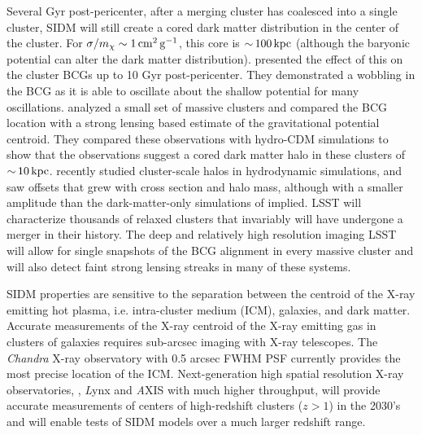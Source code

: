 Several Gyr post-pericenter, after a merging cluster has coalesced into a single cluster, SIDM will still create a cored dark matter distribution in the center of the cluster. For $\sigma/m_\chi \sim 1 \mathrm{\,cm}^{2} \mathrm{\,g}^{-1}$, this core is $ {\sim}\, 100 \mathrm{\,kpc}$ (although the baryonic potential can alter the dark matter distribution). \citet{Kim:2016ujt} presented the effect of this on the cluster BCGs up to 10 Gyr post-pericenter. They demonstrated a wobbling in the BCG as it is able to oscillate about the shallow potential for many oscillations. \citet{1703.07365} analyzed a small set of massive clusters and compared the BCG location with a strong lensing based estimate of the gravitational potential centroid. They compared these observations with hydro-CDM simulations to show that the observations suggest a cored dark matter halo in these clusters of $ {\sim}\, 10\mathrm{\,kpc}$. \citet{Harvey:2018uwf} recently studied cluster-scale halos in hydrodynamic simulations, and saw offsets that grew with cross section and halo mass, although with a smaller amplitude than the dark-matter-only simulations of \citet{Kim:2016ujt} implied. LSST will characterize thousands of relaxed clusters that invariably will have undergone a merger in their history. The deep and relatively high resolution imaging LSST will allow for single snapshots of the BCG alignment in every massive cluster and will also detect faint strong lensing streaks in many of these systems.

SIDM properties are sensitive to the separation between the  centroid of the X-ray emitting hot plasma, i.e. intra-cluster medium (ICM), galaxies, and dark matter. Accurate measurements of the X-ray centroid of the X-ray emitting gas in clusters of galaxies requires sub-arcsec imaging with X-ray telescopes. The {\it Chandra} X-ray observatory with 0.5 arcsec FWHM PSF currently provides the most precise location of the ICM. Next-generation high spatial resolution X-ray observatories, \eg, {\textit Lynx} and {\textit AXIS} with much higher throughput, will provide accurate measurements of centers of high-redshift clusters ($z > 1$) in the 2030's and will enable tests of SIDM models over a much larger redshift range.
